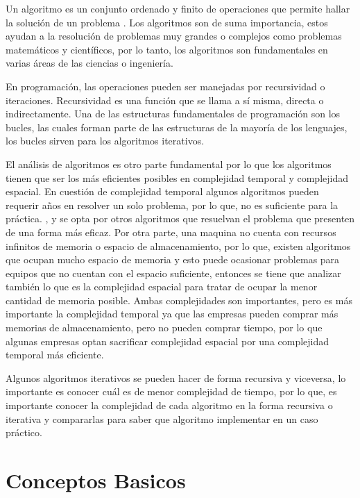 \documentclass[12pt,twoside]{article}
\begin{document}
Un algoritmo es un conjunto ordenado y finito de operaciones que permite hallar la solución de un problema \cite{algoritmo}. 
Los algoritmos son de suma importancia, estos ayudan a la resolución de problemas muy grandes o complejos como problemas matemáticos y científicos, por lo tanto, los 
algoritmos son fundamentales en varias áreas de las ciencias o ingeniería.

\par 
En programación, las operaciones pueden ser manejadas por recursividad o iteraciones. 
Recursividad es una función que se llama a sí misma, directa o indirectamente. Una de las estructuras fundamentales de programación son los bucles, 
las cuales forman parte de las estructuras de la mayoría de los lenguajes, los bucles sirven para los algoritmos iterativos. \cite{recuranditet}

\medskip

El análisis de algoritmos es otro parte fundamental por lo que los algoritmos tienen que ser los más eficientes posibles en complejidad temporal y complejidad espacial. 
En cuestión de complejidad temporal algunos algoritmos 
pueden requerir años en resolver un solo problema, por lo que, no es suficiente para la práctica.
, y se opta por otros algoritmos que resuelvan el problema que presenten de una forma más eficaz. Por otra parte, una maquina no cuenta con recursos infinitos de memoria o espacio de almacenamiento, por lo que, existen 
algoritmos que ocupan mucho espacio de memoria y esto puede ocasionar problemas para equipos que no cuentan con el espacio suficiente, entonces se tiene que analizar también lo que es la complejidad espacial para tratar de ocupar 
la menor cantidad de memoria posible. Ambas complejidades son importantes, pero es más importante la complejidad 
temporal ya que las empresas pueden comprar más memorias de almacenamiento, pero no pueden comprar tiempo, por lo que algunas empresas optan sacrificar complejidad espacial por una complejidad temporal más eficiente.

\medskip

Algunos algoritmos iterativos se pueden hacer de forma recursiva y viceversa, lo importante es conocer cuál es de menor complejidad de tiempo, por lo que, es importante conocer la complejidad de cada algoritmo en 
la forma recursiva o iterativa y compararlas para saber que algoritmo implementar en un caso práctico. 

\newpage


\newpage
\section{Conceptos Basicos}
\end{document}
